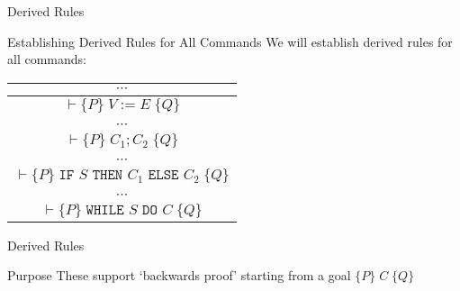 \begin{frame}{Derived Rules}
    \begin{block}{Establishing Derived Rules for All Commands}
        We will establish derived rules for all commands:

        \begin{center}
        \begin{tabular}{c}
            $\cdots$ \\
            \hline
            $\vdash \{P\} \; V:=E \; \{Q\}$ \\
            \\
            $\cdots$ \\
            \hline
            $\vdash \{P\} \; C_1;C_2 \; \{Q\}$ \\
            \\
            $\cdots$ \\
            \hline
            $\vdash \{P\} \; \texttt{IF } S \texttt{ THEN } C_1 \texttt{ ELSE } C_2 \; \{Q\}$ \\
            \\
            $\cdots$ \\
            \hline
            $\vdash \{P\} \; \texttt{WHILE } S \texttt{ DO } C \; \{Q\}$
        \end{tabular}
        \end{center}
    \end{block}
\end{frame}
\begin{frame}{Derived Rules}

    \begin{block}{Purpose}
        These support `backwards proof' starting from a goal $\{P\} \; C \; \{Q\}$
    \end{block}
\end{frame}

